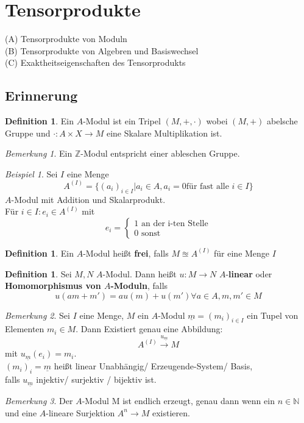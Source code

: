 \documentclass[10pt,a4paper]{article}
\newcommand{\N}{\ensuremath{\mathbb{N}}}
\newcommand{\Z}{\ensuremath{\mathbb{Z}}}
\newcounter{thm}[section]
\theoremstyle{definition}
\newtheorem{definition}[thm]{Definition}
\theoremstyle{plain}
\theoremstyle{remark}
\newtheorem*{bem*}{Bemerkung}
\newtheorem*{exm*}{Beispiel}
\begin{document}
\section{Tensorprodukte}
	(A) Tensorprodukte von Moduln\\
	(B) Tensorprodukte von Algebren und Basiswechsel\\
	(C) Exaktheitseigenschaften des Tensorprodukts\\
	
	
\subsection{Erinnerung}


\begin{definition}
	Ein $A$-Modul   ist ein Tripel $(M,+,\cdot)$ wobei $(M,+)$ abelsche Gruppe und $\cdot:A\times X\rightarrow M$ eine Skalare Multiplikation ist.
\end{definition}
\begin{bem*}
	Ein $\Z$-Modul entspricht einer ableschen Gruppe.
\end{bem*}
\begin{exm*}
	Sei $I$ eine Menge
	\[A^{(I)}=\{(a_i)_{i\in I}|a_i\in A, a_i=0\text{für fast alle $i\in I$}\}\]
	$A$-Modul mit Addition und Skalarprodukt.\\
	Für $i\in I:e_i\in A^{(I)}$ mit
	\[e_i=\begin{cases}
	\text{1 an der i-ten Stelle}\\
	\text{0 sonst}
	\end{cases}\]
\end{exm*}
\begin{definition}
	Ein $A$-Modul heißt \textbf{frei}, falls $M\approxeq A^{(I)}$ für eine Menge $I$
\end{definition}
\begin{definition}
	Sei $M,N$ $A$-Modul. Dann heißt $u:M\rightarrow N$ $A$-\textbf{linear} oder \textbf{Homomorphismus von $A$-Moduln}, falls
	\[u(am+m')=au(m)+u(m')\forall a\in A,m,m'\in M\]
\end{definition}
\begin{bem*}
	Sei $I$ eine Menge, $M$ ein $A$-Modul $\underline{m}=(m_i)_{i\in I}$ ein Tupel von Elementen $m_i\in M$. Dann Existiert genau eine Abbildung:
	\[A^{(I)}\xrightarrow{u_{\underline m} }M\]
	mit $u_{\underline{m}}(e_i)=m_i$.\\
	$(m_i)_i=\underline{m}$ heißt linear Unabhängig/ Erzeugende-System/ Basis, \\
	falls $u_{\underline{m}}$ injektiv/ surjektiv / bijektiv ist.
\end{bem*}
\begin{bem*}
	Der $A$-Modul M ist endlich erzeugt, genau dann wenn ein $n\in \N$und eine $A$-lineare Surjektion $A^n\rightarrow M$ existieren.
\end{bem*}
\end{document}
